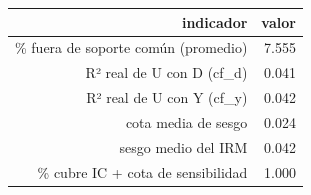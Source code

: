 \begin{tabular}{rr}
\toprule
indicador & valor \\
\midrule
\% fuera de soporte común (promedio) & 7.555 \\
R² real de U con D (cf\_d) & 0.041 \\
R² real de U con Y (cf\_y) & 0.042 \\
cota media de sesgo & 0.024 \\
sesgo medio del IRM & 0.042 \\
\% cubre IC + cota de sensibilidad & 1.000 \\
\bottomrule
\end{tabular}